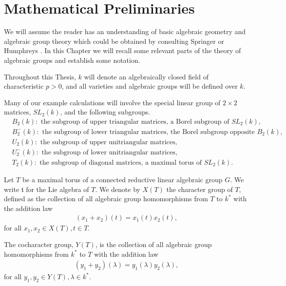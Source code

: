 
\chapter{Mathematical Preliminaries}
\label{Chapter2}

We will assume the reader has an understanding of basic algebraic geometry and algebraic group theory which could be obtained by consulting Springer \cite{springer2008linear} or Humphreys \cite{humphreys1975linear}. In this Chapter we will recall some relevant parts of the theory of algebraic groups and establish some notation.

Throughout this Thesis, $k$ will denote an algebraically closed field of characteristic $p>0$, and all varieties and algebraic groups will be defined over $k$.

Many of our example calculations will involve the special linear group of $2\times 2$ matrices, $SL_2(k)$, and the following subgroups.
\begin{align*}
	&B_2(k): \textrm{ the subgroup of upper triangular matrices, a Borel subgroup of }SL_2(k),\\
	&B^-_2(k): \textrm{ the subgroup of lower triangular matrices, the Borel subgroup opposite }B_2(k),\\
	&U_2(k): \textrm{ the subgroup of upper unitriangular matrices},\\
	&U^-_2(k): \textrm{ the subgroup of lower unitriangular matrices},\\
	&T_2(k): \textrm{ the subgroup of diagonal matrices, a maximal torus of }SL_2(k).
\end{align*}

Let $T$ be a maximal torus of a connected reductive linear algebraic group $G$. We write $\mathfrak{t}$ for the Lie algebra of $T$. We denote by $X(T)$ the character group of $T$, defined as the collection of all algebraic group homomorphisms from $T$ to $k^*$ with the addition law
\begin{align*}
	(x_1 + x_2)(t) = x_1(t)x_2(t),
\end{align*}
for all $x_1, x_2\in X(T), t\in T$.

The cocharacter group, $Y(T)$, is the collection of all algebraic group homomorphisms from $k^*$ to $T$ with the addition law
\begin{align*}
	(y_1 + y_2)(\lambda) = y_1(\lambda)y_2(\lambda),
\end{align*}
for all $y_1, y_2\in Y(T), \lambda \in k^*$.

